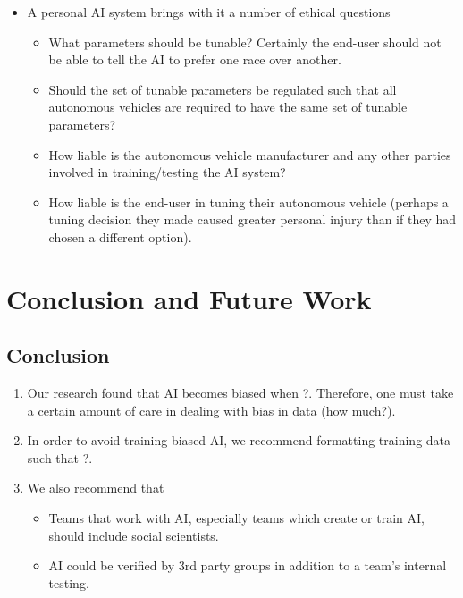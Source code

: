 \documentclass[]{report}
\begin{document}
\begin{itemize}
\begin{itemize}
        \item A personal AI system brings with it a number of ethical questions
        \begin{itemize}
            \item What parameters should be tunable? Certainly the end-user should not be able to
            tell the AI to prefer one race over another.
            \item Should the set of tunable parameters be regulated such that all autonomous
            vehicles are required to have the same set of tunable parameters?
            \item How liable is the autonomous vehicle manufacturer and any other parties involved
            in training/testing the AI system?
            \item How liable is the end-user in tuning their autonomous vehicle (perhaps a tuning
            decision they made caused greater personal injury than if they had chosen a different
            option).
        \end{itemize}
    \end{itemize}
\end{itemize}

\FloatBarrier
\chapter{Conclusion and Future Work}
\section{Conclusion}

\begin{enumerate}
    \item Our research found that AI becomes biased when ?. Therefore, one must take a certain
    amount of care in dealing with bias in data (how much?).
    
    \item In order to avoid training biased AI, we recommend formatting training data such that ?.
    
    \item We also recommend that
    \begin{itemize}
        \item Teams that work with AI, especially teams which create or train AI, should include
        social scientists.
        
        \item AI could be verified by 3rd party groups in addition to a team's internal testing.
    \end{itemize}
\end{enumerate}
\end{document}

